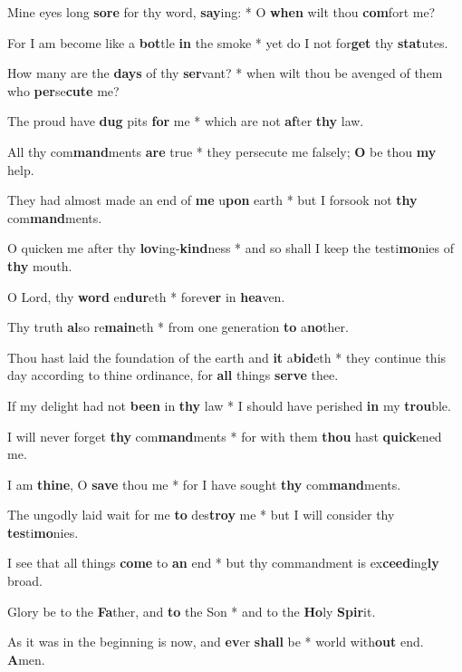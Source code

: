 \begin{multicols}{2}
	Mine eyes long \textbf{sore} for thy word, \textbf{say}ing: * O \textbf{when} wilt thou \textbf{com}fort me?
	
	For I am become like a \textbf{bot}tle \textbf{in} the smoke * yet do I not for\textbf{get} thy \textbf{stat}utes.
	
	How many are the \textbf{days} of thy \textbf{ser}vant? * when wilt thou be avenged of them who \textbf{per}se\textbf{cute} me?
	
	The proud have \textbf{dug} pits \textbf{for} me * which are not \textbf{af}ter \textbf{thy} law.
	
	All thy com\textbf{mand}ments \textbf{are} true * they persecute me falsely; \textbf{O} be thou \textbf{my} help.
	
	They had almost made an end of \textbf{me} u\textbf{pon} earth * but I forsook not \textbf{thy} com\textbf{mand}ments.
	
	O quicken me after thy \textbf{lov}ing-\textbf{kind}ness * and so shall I keep the testi\textbf{mo}nies of \textbf{thy} mouth.
	
	O Lord, thy \textbf{word} en\textbf{dur}eth * forev\textbf{er} in \textbf{hea}ven.
	
	Thy truth \textbf{al}so re\textbf{main}eth * from one generation \textbf{to} a\textbf{no}ther.
	
	Thou hast laid the foundation of the earth and \textbf{it} a\textbf{bid}eth * they continue this day according to thine ordinance, for \textbf{all} things \textbf{serve} thee.
	
	If my delight had not \textbf{been} in \textbf{thy} law * I should have perished \textbf{in} my \textbf{trou}ble.
	
	I will never forget \textbf{thy} com\textbf{mand}ments * for with them \textbf{thou} hast \textbf{quick}ened me.
	
	I am \textbf{thine}, O \textbf{save} thou me * for I have sought \textbf{thy} com\textbf{mand}ments.
	
	The ungodly laid wait for me \textbf{to} des\textbf{troy} me * but I will consider thy \textbf{tes}ti\textbf{mo}nies.
	
	I see that all things \textbf{come} to \textbf{an} end * but thy commandment is ex\textbf{ceed}ing\textbf{ly} broad.
	
	Glory be to the \textbf{Fa}ther, and \textbf{to} the Son * and to the \textbf{Ho}ly \textbf{Spir}it.
	
	As it was in the beginning is now, and \textbf{ev}er \textbf{shall} be * world with\textbf{out} end. \textbf{A}men.
\end{multicols}